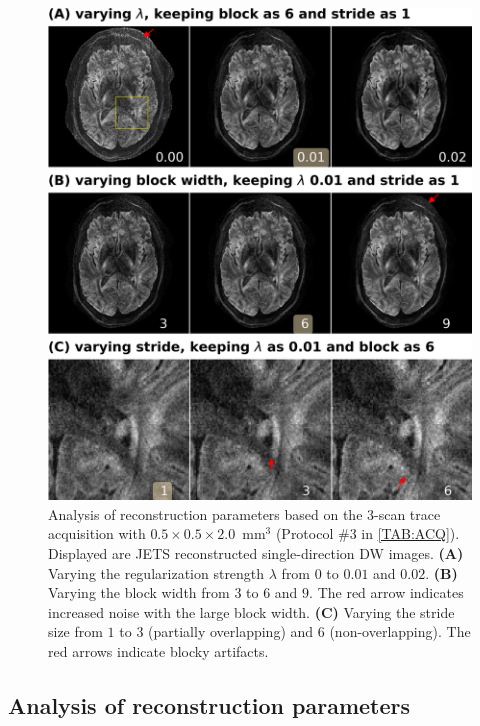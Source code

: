 \documentclass[preprint,12pt,authoryear,review]{elsarticle}
\begin{document}
    \begin{figure}
        \centering
        \includegraphics[width=\textwidth]{../figures/fig6.png}
        \caption{Analysis of reconstruction parameters based on
        the 3-scan trace acquisition with $0.5\times0.5\times2.0$~mm$^3$
        (Protocol \#3 in \cref{TAB:ACQ}).
        Displayed are JETS reconstructed single-direction DW images.
        \textbf{(A)} Varying the regularization strength $\lambda$
        from $0$ to $0.01$ and $0.02$.
        \textbf{(B)} Varying the block width from $3$ to $6$ and $9$.
        The red arrow indicates increased noise
        with the large block width.
        \textbf{(C)} Varying the stride size from $1$ to
        $3$ (partially overlapping) and
        $6$ (non-overlapping).
        The red arrows indicate blocky artifacts.}
        \label{FIG:ablation}
    \end{figure}

    \subsection{Analysis of reconstruction parameters}
\end{document}
